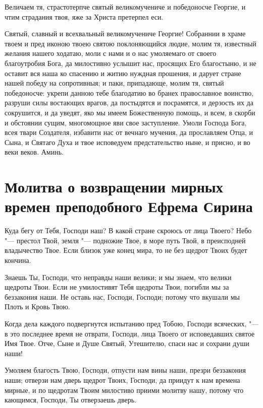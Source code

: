 

Величаем тя, страстотерпче святый великомучениче и победоносче Георгие, и чтим страдания твоя, яже за Христа претерпел еси.




Святый, славный и всехвальный великомучениче Георгие! Собраннии в храме твоем и пред иконою твоею святою поклоняющийся людие, молим тя, известный желания нашего ходатаю, моли с нами и о нас умоляемаго от своего благоутробия Бога, да милостивно услышит нас, просящих Его благостыню, и не оставит вся наша ко спасению и житию нуждная прошения, и дарует стране нашей победу на сопротивныя; и паки, припадающе, молим тя, святый победоносче: укрепи данною тебе благодатию во бранех православное воинство, разруши силы востающих врагов, да постыдятся и посрамятся, и дерзость их да сокрушится, и да уведят, яко мы имеем Божественную помощь, и всем, в скорби и обстоянии сущим, многомощное яви свое заступление. Умоли Господа Бога, всея твари Создателя, избавити нас от вечнаго мучения, да прославляем Отца, и Сына, и Святаго Духа и твое исповедуем предстательство ныне, и присно, и во веки веков. Аминь.


\section{Молитва о возвращении мирных времен преподобного Ефрема Сирина}
 


Куда бегу от Тебя, Господи наш? В какой стране скроюсь от лица Твоего? Небо "--- престол Твой, земля "--- подножие Твое, в море путь Твой, в преисподней владычество Твое. Если близок уже конец мира, то не без щедрот Твоих будет кончина. 

Знаешь Ты, Господи, что неправды наши велики; и мы знаем, что велики щедроты Твои. Если не умилостивят Тебя щедроты Твои, погибли мы за беззакония наши. Не оставь нас, Господи, Господи; потому что вкушали мы Плоть и Кровь Твою. 

Когда дела каждого подвергнутся испытанию пред Тобою, Господи всяческих, "--- в это последнее время не отврати, Господи, лица Твоего от исповедавших святое Имя Твое. Отче, Сыне и Душе Святый, Утешителю, спаси нас и сохрани души наши! 

Умоляем благость Твою, Господи, отпусти нам вины наши, презри беззакония наши; отверзи нам дверь щедрот Твоих, Господи, да приидут к нам времена мирные, и по щедротам Твоим милостиво приими молитву нашу, потому что кающимся, Господи, Ты отверзаешь дверь.
\mychapterending

